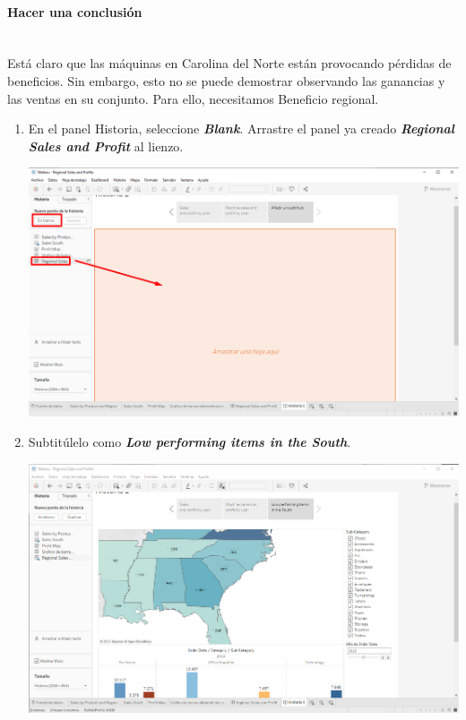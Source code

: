 \documentclass[12pt,letterpaper]{article}
\begin{document}
    \paragraph{\Large Hacer una conclusión\\ \\}
    Está claro que las máquinas en Carolina del Norte están provocando pérdidas de beneficios. Sin embargo, esto no se puede demostrar observando las ganancias y las ventas en su conjunto. Para ello, necesitamos Beneficio regional.
    \begin{enumerate}
        \item En el panel Historia, seleccione \textit{\textbf{Blank}}. Arrastre el panel ya creado \textit{\textbf{Regional Sales and Profit}} al lienzo.
        \begin{center}
            \includegraphics[width=15cm]{./img/img93.png}
        \end{center}
        \item Subtitúlelo como \textit{\textbf{Low performing items in the South}}.
        \begin{center}
            \includegraphics[width=15cm]{./img/img94.png}

\end{center}
\end{enumerate}
\end{document}
